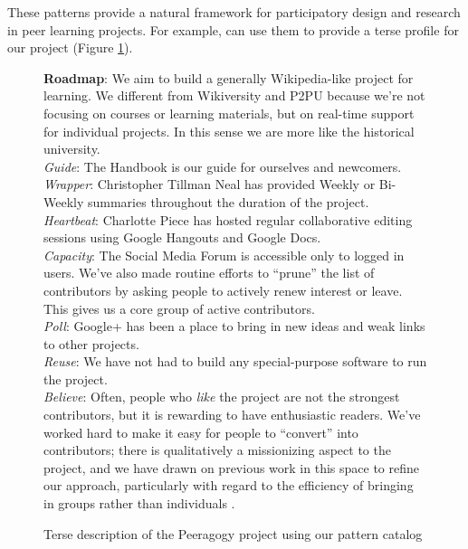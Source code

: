 \documentclass{acm_proc_article-sp}
\newenvironment{cframed}[1][blue]
  {\def\FrameCommand{\fboxsep=\FrameSep\fcolorbox{#1}{white}}%
    \MakeFramed {\advance\hsize-\width \FrameRestore}}
  {\endMakeFramed}
\begin{document}
These patterns provide a natural framework for participatory design
and research in peer learning projects.  For example, can use them to
provide a terse profile for our project (Figure \ref{catalog}).

\begin{figure}[h]
\begin{cframed}[black]
{\bf Roadmap}: We aim to build a generally Wikipedia-like project for
learning.  We different from Wikiversity and P2PU because we're not
focusing on courses or learning materials, but on real-time support
for individual projects.  In this sense we are more like the
historical university. \\

\emph{Guide}: The Handbook is our guide for ourselves and newcomers. \\

\emph{Wrapper}: Christopher Tillman Neal has provided Weekly or
Bi-Weekly summaries throughout the duration of the project. \\

\emph{Heartbeat}: Charlotte Piece has hosted regular collaborative
editing sessions using Google Hangouts and Google Docs. \\

\emph{Capacity}: The Social Media Forum is accessible only to logged in
users.  We've also made routine efforts to ``prune'' the list of
contributors by asking people to actively renew interest or leave.
This gives us a core group of active contributors. \\

\emph{Poll}: Google+ has been a place to bring in new ideas and weak
links to other projects. \\

\emph{Reuse}: We have not had to build any special-purpose software to
run the project.  \\

\emph{Believe}: Often, people who \emph{like} the project are not the
strongest contributors, but it is rewarding to have enthusiastic
readers.  We've worked hard to make it easy for people to ``convert''
into contributors; there is qualitatively a missionizing aspect to the
project, and we have drawn on previous work in this space to refine
our approach, particularly with regard to the efficiency of bringing
in groups rather than individuals \cite{Bridges}.
\end{cframed}
\vspace{-.2in}
\caption{Terse description of the Peeragogy project using our pattern catalog \label{catalog}}
\end{figure}
\end{document}
